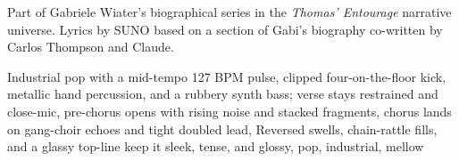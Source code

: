 
\begin{notes}
Part of Gabriele Wiater's biographical series in the \emph{Thomas’ Entourage} narrative universe. Lyrics by SUNO based on a section of Gabi's biography co-written by Carlos Thompson and Claude.
\end{notes}
\begin{style}
Industrial pop with a mid-tempo 127 BPM pulse, clipped four-on-the-floor kick, metallic hand percussion, and a rubbery synth bass; verse stays restrained and close-mic, pre-chorus opens with rising noise and stacked fragments, chorus lands on gang-choir echoes and tight doubled lead, Reversed swells, chain-rattle fills, and a glassy top-line keep it sleek, tense, and glossy, pop, industrial, mellow
\end{style}
